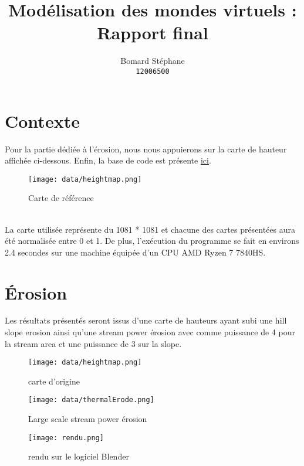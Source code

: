 \documentclass[11pt, letterpaper]{article}
\title{Modélisation des mondes virtuels : \\
    Rapport final}
\author{Bomard Stéphane \\
        {\tt\small 12006500}}
\begin{document}
    \maketitle
    
    \section{Contexte}
        Pour la partie dédiée à l'érosion, nous nous appuierons sur la carte de hauteur affichée ci-dessous.
        Enfin, la base de code est présente \href{https://github.com/Styami/Modelisation-mondes-virtuels.git}{ici}.
        \begin{figure}[!h]
            \centering 
            \texttt{[image: data/heightmap.png]} 
            \caption{Carte de référence}
            \label{fig:ref}
        \end{figure}\hfill
        \\
        La carte utilisée représente du 1081 * 1081 et chacune des cartes présentées aura été normalisée entre 0 et 1.
        De plus, l'exécution du programme se fait en environs 2.4 secondes sur une machine équipée d'un CPU AMD Ryzen 7 7840HS.
        \\

    \section{Érosion}
        Les résultats présentés seront issus d'une carte de hauteurs ayant subi une hill slope erosion
        ainsi qu'une stream power érosion avec comme puissance de 4 pour la stream area et une puissance de 3 sur la slope.
        \pagebreak
        \begin{figure}[!h]
            \centering
            \begin{minipage}{0.35\linewidth}
                \texttt{[image: data/heightmap.png]} 
                \caption{carte d'origine}
                \label{fig:posTex}
            \end{minipage}\hfill
            \begin{minipage}{0.35\linewidth}
                \texttt{[image: data/thermalErode.png]}
                \caption{Large scale stream power érosion}
                \label{fig:uvTex}
            \end{minipage}
            \begin{minipage}{0.45\linewidth}
                \centering
                \texttt{[image: rendu.png]}
                \caption{rendu sur le logiciel Blender}
                \label{fig:blender}
            \end{minipage}
        \end{figure}
        
\end{document}
